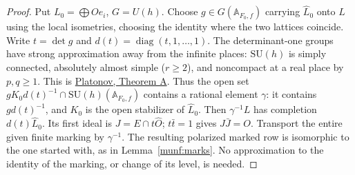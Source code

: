 \begin{proof}
Put \(L_0=\bigoplus O e_i\), \(G=U(h)\). Choose
\(g\in G(\mathbb A_{F_0,f})\) carrying \(\widehat L_0\) onto
\(\widehat L\) using the local isometries, choosing the identity
where the two lattices coincide. Write \(t=\det g\) and
\(d(t)=\operatorname{diag}(t,1,\dots,1)\). The determinant-one
groups have strong approximation away from the infinite places:
\(\mathrm{SU}(h)\) is simply connected, absolutely almost simple
(\(r\ge2\)), and noncompact at a real place by \(p,q\ge1\).
This is \href{https://www.mathnet.ru/links/02c4d3528af06a248862fb1aa3ba53f9/im2220_eng.pdf}
{Platonov, Theorem A}. Thus the open set
\(g K_0 d(t)^{-1}\cap\mathrm{SU}(h)(\mathbb A_{F_0,f})\)
contains a rational element \(\gamma\): it contains
\(g d(t)^{-1}\), and \(K_0\) is the open stabilizer of
\(\widehat L_0\). Then \(\gamma^{-1}L\) has completion
\(d(t)\widehat L_0\). Its first ideal is
\(J=E\cap t\widehat O\); \(t\bar t=1\) gives \(J\bar J=O\).
Transport the entire given finite marking by \(\gamma^{-1}\).
The resulting polarized marked row is isomorphic to the one
started with, as in Lemma~\ref{munf:marks}. No approximation to
the identity of the marking, or change of its level, is needed.
\end{proof}

